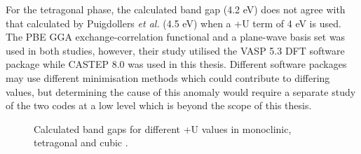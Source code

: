 For the tetragonal phase, the calculated band gap (4.2 eV) does not agree with that calculated by Puigdollers \emph{et al.} (4.5 eV) when a +U term of 4 eV is used\cite{RuizPuigdollers2016}. The PBE GGA exchange-correlation functional and a plane-wave basis set was used in both studies, however, their study utilised the VASP 5.3 DFT software package while CASTEP 8.0 was used in this thesis. Different software packages may use different minimisation methods which could contribute to differing values, but determining the cause of this anomaly would require a separate study of the two codes at a low level which is beyond the scope of this thesis.




\begin{figure}[ht] %
\begin{center}
		\caption{Calculated band gaps for different +U values in monoclinic, tetragonal and cubic \zirconia .}
		\label{Figure:plusubandgap}
	\end{center}
\end{figure}

